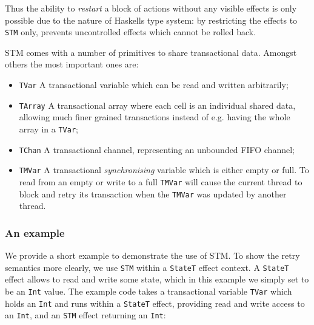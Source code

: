 Thus the ability to \textit{restart} a block of actions without any visible effects is only possible due to the nature of Haskells type system: by restricting the effects to \texttt{STM} only, prevents uncontrolled effects which cannot be rolled back.

STM comes with a number of primitives to share transactional data. Amongst others the most important ones are:

\begin{itemize}
	\item \texttt{TVar}   A transactional variable which can be read and written arbitrarily;
	\item \texttt{TArray}   A transactional array where each cell is an individual shared data, allowing much finer grained transactions instead of e.g. having the whole array in a \texttt{TVar};
	\item \texttt{TChan}   A transactional channel, representing an unbounded FIFO channel;
	\item \texttt{TMVar}   A transactional \textit{synchronising} variable which is either empty or full. To read from an empty or write to a full \texttt{TMVar} will cause the current thread to block and retry its transaction when the \texttt{TMVar} was updated by another thread.
\end{itemize}


\subsubsection{An example}
\label{sub:stm_example}
We provide a short example to demonstrate the use of STM. To show the retry semantics more clearly, we use \texttt{STM} within a \texttt{StateT} effect context. A \texttt{StateT} effect allows to read and write some state, which in this example we simply set to be an \texttt{Int} value. The example code takes a transactional variable \texttt{TVar} which holds an \texttt{Int} and runs within a \texttt{StateT} effect, providing read and write access to an \texttt{Int}, and an \texttt{STM} effect returning an \texttt{Int}:

